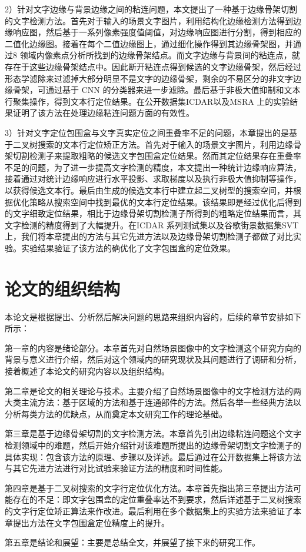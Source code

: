     2）针对文字边缘与背景边缘之间的粘连问题，本文提出了一种基于边缘骨架切割的文字检测方法。首先对于输入的场景文字图片，利用结构化边缘检测方法得到边缘响应图，然后基于一系列像素强度值阈值，对边缘响应图进行分割，得到相应的二值化边缘图。接着在每个二值边缘图上，通过细化操作得到其边缘骨架图，并通过8 领域内像素点分析所找到的边缘骨架结点。而文字边缘与背景间的粘连点，就存在于这些边缘骨架结点中。因此断开粘连点得到候选的文字边缘骨架，然后经过形态学滤除来过滤掉大部分明显不是文字的边缘骨架，剩余的不易区分的非文字边缘骨架，可通过基于 CNN 的分类器来进一步滤除。最后基于非极大值抑制和文本行聚集操作，得到文本行定位结果。在公开数据集ICDAR以及MSRA 上的实验结果证明了该方法在处理边缘粘连问题方面的有效性。

    3）针对文字定位包围盒与文字真实定位之间重叠率不足的问题，本章提出的是基于二叉树搜索的文本行定位矫正方法。首先对于输入的场景文字图片，利用边缘骨架切割检测子来提取粗略的候选文字包围盒定位结果。然而其定位结果存在重叠率不足的问题，为了进一步提高文字检测的精度，本文提出一种统计边缘响应算法，接着通过对统计边缘响应进行水平投影、求取梯度以及执行非极大值抑制等操作，以获得候选文本行。最后由生成的候选文本行中建立起二叉树型的搜索空间，并根据优化策略从搜索空间中找到最优的文本行定位结果。该结果即是经过优化后得到的文字细致定位结果，相比于边缘骨架切割检测子所得到的粗略定位结果而言，其文字检测的精度得到了大幅提升。在ICDAR 系列测试集以及谷歌街景数据集SVT 上，我们将本章提出的方法与其它先进方法以及边缘骨架切割检测子都做了对比实验。实验结果验证了该方法的确优化了文字包围盒的定位效果。

    \section{论文的组织结构}

    本论文是根据提出、分析然后解决问题的思路来组织内容的，后续的章节安排如下所示：

    第一章的内容是绪论部分。本章首先对自然场景图像中的文字检测这个研究方向的背景与意义进行介绍，然后对这个领域内的研究现状及其问题进行了调研和分析，接着概述了本论文的研究内容以及组织结构。

    第二章是论文的相关理论与技术。主要介绍了自然场景图像中的文字检测方法的两大类主流方法：基于区域的方法和基于连通部件的方法。然后各举一些经典方法以分析每类方法的优缺点，从而奠定本文研究工作的理论基础。

    第三章是基于边缘骨架切割的文字检测方法。本章首先引出边缘粘连问题这个文字检测领域中的难题，然后开始介绍针对该难题所提出的边缘骨架切割文字检测子的具体实现：包含该方法的原理、步骤以及详述。最后通过在公开数据集上将该方法与其它先进方法进行对比试验来验证方法的精度和时间性能。

    第四章是基于二叉树搜索的文字行定位优化方法。本章首先指出第三章提出方法可能存在的不足：即文字包围盒的定位重叠率达不到要求，然后详述基于二叉树搜索的文字行定位矫正算法来作改进。最后利用在多个数据集上的实验方法来验证了本章提出方法在文字包围盒定位精度上的提升。

    第五章是结论和展望：主要是总结全文，并展望了接下来的研究工作。


